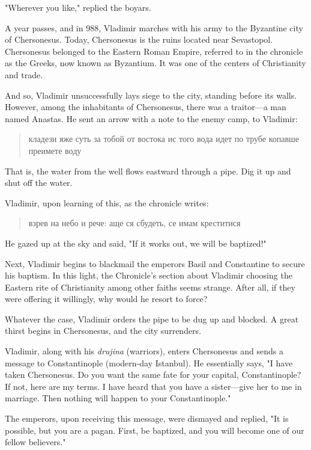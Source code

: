 \documentclass[a5paper,11pt,openany]{article}
\begin{document}
 "Wherever you like," replied the boyars.

A year passes, and in 988, Vladimir marches with his army to the Byzantine city of Chersonesus. Today, Chersonesus is the ruins located near Sevastopol. Chersonesus belonged to the Eastern Roman Empire, referred to in the chronicle as the Greeks, now known as Byzantium. It was one of the centers of Christianity and trade.

And so, Vladimir unsuccessfully lays siege to the city, standing before its walls. However, among the inhabitants of Chersonesus, there was a traitor—a man named Anastas. He sent an arrow with a note to the enemy camp, to Vladimir:

\begin{quotation}
\noindent кладези яже суть за тобой от востока ис того вода идет по трубе копавше преимете воду
\end{quotation}

That is, the water from the well flows eastward through a pipe. Dig it up and shut off the water.

Vladimir, upon learning of this, as the chronicle writes:

\begin{quotation}
\noindent взрев на небо и рече: аще ся сбудеть, се имам креститися
\end{quotation}

He gazed up at the sky and said, "If it works out, we will be baptized!"

Next, Vladimir begins to blackmail the emperors Basil and Constantine to secure his baptism. In this light, the Chronicle's section about Vladimir choosing the Eastern rite of Christianity among other faiths seems strange. After all, if they were offering it willingly, why would he resort to force?

Whatever the case, Vladimir orders the pipe to be dug up and blocked. A great thirst begins in Chersonesus, and the city surrenders.

Vladimir, along with his \textit{drujina} (warriors), enters Chersonesus and sends a message to Constantinople (modern-day Istanbul). He essentially says, "I have taken Chersonesus. Do you want the same fate for your capital, Constantinople? If not, here are my terms. I have heard that you have a sister—give her to me in marriage. Then nothing will happen to your Constantinople."

The emperors, upon receiving this message, were dismayed and replied, "It is possible, but you are a pagan. First, be baptized, and you will become one of our fellow believers."
\end{document}
